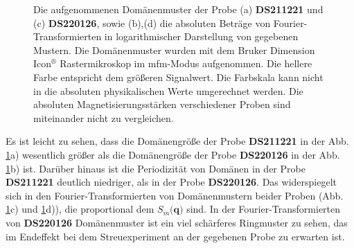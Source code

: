 \begin{figure}[H]
    \centering
    
    \caption{Die aufgenommenen Domänenmuster der Probe (a) \textbf{DS211221} und (c) \textbf{DS220126}, sowie (b),(d) die absoluten Beträge von Fourier-Transformierten in logarithmischer Darstellung von gegebenen Mustern. Die Domänenmuster wurden mit dem Bruker Dimension Icon$^{\text{®}}$ Rastermikroskop im \gls{mfm}-Modus aufgenommen. Die hellere Farbe entspricht dem größeren Signalwert. Die Farbskala kann nicht in die absoluten physikalischen Werte umgerechnet werden. Die absoluten Magnetisierungsstärken verschiedener Proben sind miteinander nicht zu vergleichen.}
    \label{fig:mfm-amplitude-ft}
\end{figure}
\noindent
Es ist leicht zu sehen, dass die Domänengröße der Probe \textbf{DS211221} in der Abb. \ref{fig:mfm-amplitude-ft}a) wesentlich größer als die Domänengröße der Probe \textbf{DS220126} in der Abb. \ref{fig:mfm-amplitude-ft}b) ist. Darüber hinaus ist die Periodizität von Domänen in der Probe \textbf{DS211221} deutlich niedriger, als in der Probe  \textbf{DS220126}. Das widerspiegelt sich in den Fourier-Transformierten von Domänenmustern beider Proben (Abb. \ref{fig:mfm-amplitude-ft}c) und \ref{fig:mfm-amplitude-ft}d)), die proportional dem $S_m(\mathbf{q)}$ sind. In der Fourier-Transformierten von \textbf{DS220126} Domänenmuster ist ein viel schärferes Ringmuster zu sehen, das im Endeffekt bei dem Streuexperiment an der gegebenen Probe zu erwarten ist.

